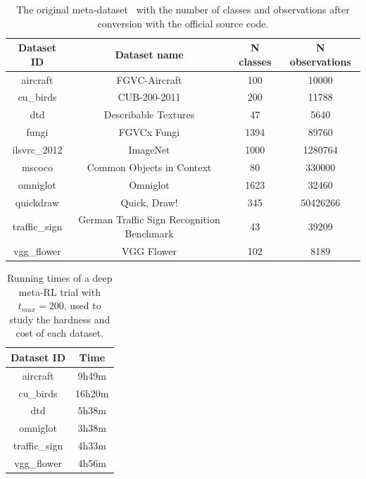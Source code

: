 \begin{table}[ht]
\centering
\begin{tabular}{cccc}
\hline
Dataset ID    & Dataset name                              & N classes & N observations \\ \hline
aircraft      & FGVC-Aircraft                             & 100       & 10000          \\
cu\_birds     & CUB-200-2011                              & 200       & 11788          \\
dtd           & Describable Textures                      & 47        & 5640           \\
fungi         & FGVCx Fungi                               & 1394      & 89760          \\
ilsvrc\_2012  & ImageNet                                  & 1000      & 1280764        \\
mscoco        & Common Objects in Context                 & 80        & 330000         \\
omniglot      & Omniglot                                  & 1623      & 32460          \\
quickdraw     & Quick, Draw!                              & 345       & 50426266       \\
traffic\_sign & German Traffic Sign Recognition Benchmark & 43        & 39209          \\
vgg\_flower   & VGG Flower                                & 102       & 8189           \\ \hline
\end{tabular}
\caption{The original meta-dataset~\citep{MetaDataset} with the number of classes and observations after conversion with the official source code.}
\label{tab:appA:metadataset}
\end{table}



\begin{table}[ht]
\centering
\begin{tabular}{cc}
\hline
Dataset ID    & Time   \\ \hline
aircraft      & 9h49m  \\
cu\_birds     & 16h20m \\
dtd           & 5h38m  \\
omniglot      & 3h38m  \\
traffic\_sign & 4h33m  \\
vgg\_flower   & 4h56m  \\ \hline
\end{tabular}
\caption{Running times of a deep meta-RL trial with $t_{max}=200$, used to study the hardness and cost of each dataset.}
\label{tab:appA:times}
\end{table}

